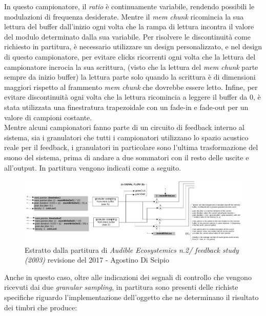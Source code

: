In questo campionatore, il \textit{ratio} è continuamente variabile, 
rendendo possibili le modulazioni di frequenza desiderate. 
Mentre il \textit{mem chunk} ricomincia la sua lettura del buffer dall'inizio 
ogni volta che la rampa di lettura incontra il valore del modulo determinato dalla sua variabile.
Per risolvere le discontinuità come richiesto in partitura, 
è necessario utilizzare un design personalizzato,
e nel design di questo campionatore, 
per evitare clicks ricorrenti ogni volta che la lettura del campionatore incrocia la sua scrittura, 
(visto che la lettura del \textit{mem chunk} parte sempre da inizio buffer)
la lettura parte solo quando la scrittura è di dimensioni maggiori rispetto al frammento \textit{mem chunk} 
che dovrebbe essere letto.
Infine, per evitare discontinuità ogni volta che la lettura ricomincia a leggere il buffer da 0, 
è stata utilizzata una finestratura trapezoidale con un fade-in e fade-out 
per un valore di campioni costante. \\
Mentre alcuni campionatori fanno parte di un circuito di feedback interno al sistema, 
sia i granulatori che tutti i campionatori utilizzano lo spazio acustico reale per il feedback,
i granulatori in particolare sono l'ultima trasformazione del suono del sistema, prima di andare a 
due sommatori con il resto delle uscite e all'output.
In partitura vengono indicati come a seguito. \\

\begin{figure}[h!]
\begin{center}
    \includegraphics[width=14cm]{figures/GRANULATORSFeedbackstudy2017.pdf}
    \caption{Estratto dalla partitura di \textit{Audible Ecosystemics n.2/ feedback study (2003)}
    revisione del 2017 - Agostino Di Scipio}
    \vspace{0.5cm}
\end{center}
\end{figure}

Anche in questo caso, oltre alle indicazioni dei segnali di controllo che vengono
ricevuti dai due \textit{granular sampling}, 
in partitura sono presenti delle richiste specifiche riguardo l'implementazione 
dell'oggetto che ne determinano il risultato dei timbri che produce: \\

